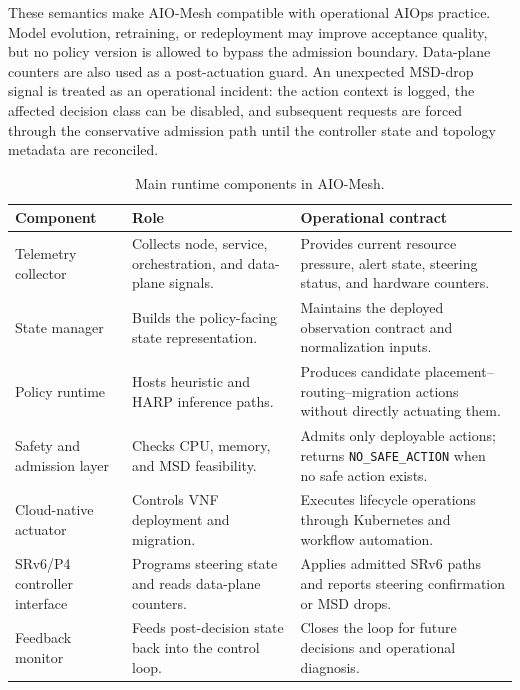 \documentclass[final,5p]{elsarticle}
\begin{document}
These semantics make AIO-Mesh compatible with operational AIOps practice. Model evolution, retraining, or redeployment may improve acceptance quality, but no policy version is allowed to bypass the admission boundary. Data-plane counters are also used as a post-actuation guard. An unexpected MSD-drop signal is treated as an operational incident: the action context is logged, the affected decision class can be disabled, and subsequent requests are forced through the conservative admission path until the controller state and topology metadata are reconciled.

\begin{table}[t]
\centering
\caption{Main runtime components in AIO-Mesh.}
\label{tab:aio_mesh_components}
\renewcommand{\arraystretch}{1.15}
\small
\begin{tabular}{p{3.4cm}p{5.0cm}p{8.4cm}}
\toprule
\textbf{Component} & \textbf{Role} & \textbf{Operational contract} \\
\midrule
Telemetry collector &
Collects node, service, orchestration, and data-plane signals. &
Provides current resource pressure, alert state, steering status, and hardware counters. \\

State manager &
Builds the policy-facing state representation. &
Maintains the deployed observation contract and normalization inputs. \\

Policy runtime &
Hosts heuristic and HARP inference paths. &
Produces candidate placement--routing--migration actions without directly actuating them. \\

Safety and admission layer &
Checks CPU, memory, and MSD feasibility. &
Admits only deployable actions; returns \texttt{NO\_SAFE\_ACTION} when no safe action exists. \\

Cloud-native actuator &
Controls VNF deployment and migration. &
Executes lifecycle operations through Kubernetes and workflow automation. \\

SRv6/P4 controller interface &
Programs steering state and reads data-plane counters. &
Applies admitted SRv6 paths and reports steering confirmation or MSD drops. \\

Feedback monitor &
Feeds post-decision state back into the control loop. &
Closes the loop for future decisions and operational diagnosis. \\
\bottomrule
\end{tabular}
\end{table}
\end{document}
